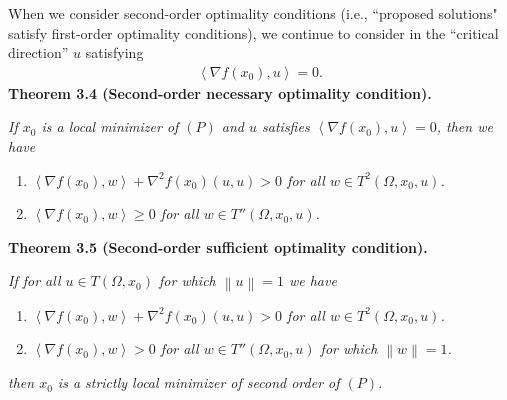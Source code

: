 \documentclass[a4paper]{article}
\numberwithin{equation}{section}
\begin{document}
When we consider second-order optimality conditions (i.e., ``proposed solutions" satisfy first-order optimality conditions), we continue to consider in the ``critical direction'' $u$ satisfying
\begin{align}
\left\langle {\nabla f\left( {{x_0}} \right),u} \right\rangle  = 0.
\end{align}
\textbf{Theorem 3.4 (Second-order necessary optimality condition).} 

\textit{If $x_0$ is a local minimizer of $\left(P\right)$ and $u$ satisfies $\left\langle {\nabla f\left( {{x_0}} \right),u} \right\rangle  = 0$, then we have}
\begin{enumerate}
\item \textit{$\left\langle {\nabla f\left( {{x_0}} \right),w} \right\rangle  + {\nabla ^2}f\left( {{x_0}} \right)\left( {u,u} \right) > 0$ for all $w\in T^2\left(\Omega,x_0,u\right)$.}
\item \textit{$\left\langle {\nabla f\left( {{x_0}} \right),w} \right\rangle  \ge 0$ for all $w\in T''\left(\Omega,x_0,u\right)$.}
\end{enumerate}
\textbf{Theorem 3.5 (Second-order sufficient optimality condition).} 

\textit{If for all $u\in T\left(\Omega,x_0\right)$ for which $\left\| u \right\| = 1$ we have}
\begin{enumerate}
\item \textit{$\left\langle {\nabla f\left( {{x_0}} \right),w} \right\rangle  + {\nabla ^2}f\left( {{x_0}} \right)\left( {u,u} \right) > 0$ for all $w\in T^2\left(\Omega,x_0,u\right)$.}
\item \textit{$\left\langle {\nabla f\left( {{x_0}} \right),w} \right\rangle  > 0$ for all $w\in T''\left(\Omega,x_0,u\right)$ for which $\left\| w \right\| = 1$.}
\end{enumerate}
\textit{then $x_0$ is a strictly local minimizer of second order of $\left(P\right)$.}\\
\end{document}
